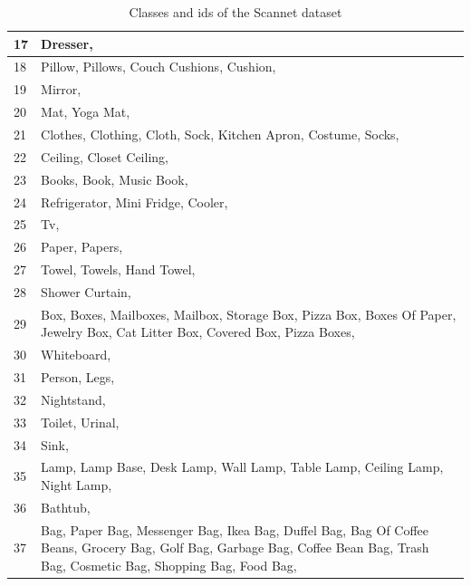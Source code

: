 \begin{table}[h]
\begin{center}
\begin{tabular}{ | l | p{17cm} |}
    			17 & Dresser, \\ \hline
    			18 & Pillow, Pillows, Couch Cushions, Cushion, \\ \hline
    			19 & Mirror, \\ \hline
    			20 & Mat, Yoga Mat, \\ \hline
    			21 & Clothes, Clothing, Cloth, Sock, Kitchen Apron, Costume, Socks, \\ \hline
    			22 & Ceiling, Closet Ceiling, \\ \hline
    			23 & Books, Book, Music Book, \\ \hline
    			24 & Refrigerator, Mini Fridge, Cooler, \\ \hline
    			25 & Tv, \\ \hline
    			26 & Paper, Papers, \\ \hline
    			27 & Towel, Towels, Hand Towel, \\ \hline
    			28 & Shower Curtain, \\ \hline
    			29 & Box, Boxes, Mailboxes, Mailbox, Storage Box, Pizza Box, Boxes Of Paper, Jewelry Box, Cat Litter Box, Covered Box, Pizza Boxes, \\ \hline
    			30 & Whiteboard, \\ \hline
    			31 & Person, Legs, \\ \hline
    			32 & Nightstand, \\ \hline
    			33 & Toilet, Urinal, \\ \hline
    			34 & Sink, \\ \hline
    			35 & Lamp, Lamp Base, Desk Lamp, Wall Lamp, Table Lamp, Ceiling Lamp, Night Lamp, \\ \hline
    			36 & Bathtub, \\ \hline
    			37 & Bag, Paper Bag, Messenger Bag, Ikea Bag, Duffel Bag, Bag Of Coffee Beans, Grocery Bag, Golf Bag, Garbage Bag, Coffee Bean Bag, Trash Bag, Cosmetic Bag, Shopping Bag, Food Bag, \\ \hline
    			
    			\hline
    		\end{tabular}
    		\caption{Classes and ids of the Scannet dataset}
    		\label{table:Classes in scannet_1}
    		
    	\end{center}
    \end{table}
    
